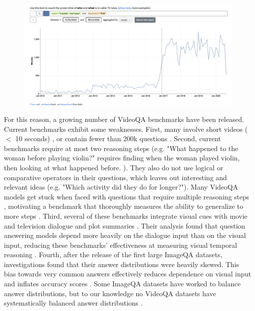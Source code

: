 \documentclass[10pt,twocolumn,letterpaper]{article}
\newcommand{\mgm}[1]{{\color{cyan}{mgm: #1}}}
\begin{document}
\begin{figure}[t]
\begin{center}
\includegraphics[width=0.8\linewidth]{test_image}
\end{center}
   \caption{}
\label{fig:long}
\label{fig:onecol}
\end{figure}

For this reason, a growing number of VideoQA benchmarks have been released. Current benchmarks exhibit some weaknesses. First, many involve short videos ($<$ 10 seconds) \cite{jang2017tgif, kim2017deepstory, xu2017video, maharaj2017dataset}, or contain fewer than 200k questions \mgm{what counts as small?} \cite{tapaswi2016movieqa, lei2018tvqa, kim2017deepstory, xu2017video, jang2017tgif, yu2019activitynet, zeng2016leveraging}. Second, current benchmarks require at most two reasoning steps (e.g. "What happened to the woman before playing violin?" requires finding when the woman played violin, then looking at what happened before. \cite{yu2019activitynet}). They also do not use logical or comparative operators in their questions, which leaves out interesting and relevant ideas (e.g. "Which activity did they do for longer?"). Many VideoQA models get stuck when faced with questions that require multiple reasoning steps \cite{fan2019heterogeneous}, motivating a benchmark that thoroughly measures the ability to generalize to more steps \mgm{rephrase last part}. Third, several of these benchmarks integrate visual cues with movie and television dialogue and plot summaries \cite{lei2018tvqa, tapaswi2016movieqa, kim2017deepstory}. Their analysis found that question answering models depend more heavily on the dialogue input than on the visual input, reducing these benchmarks' effectiveness at measuring visual temporal reasoning \cite{tapaswi2016movieqa, lei2018tvqa}. Fourth, after the release of the first large ImageQA datasets, investigations found that their answer distributions were heavily skewed. This bias towards very common answers effectively reduces dependence on visual input and inflates accuracy scores \cite{goyal2017making, hudson2019gqa}. Some ImageQA datasets have worked to balance answer distributions, but to our knowledge no VideoQA datasets have systematically balanced answer distributions \cite{goyal2017making, hudson2019gqa}. 
\end{document}
